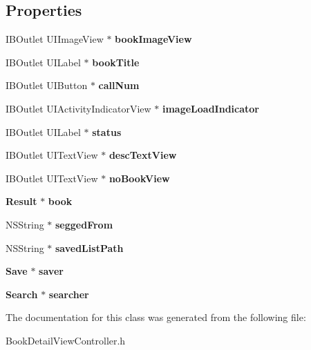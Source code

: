 \subsection*{Properties}
\begin{DoxyCompactItemize}
\item 
I\+B\+Outlet U\+I\+Image\+View $\ast$ {\bfseries book\+Image\+View}\label{interface_book_detail_view_controller_abc652edd9ccc4d9fcfb4509549ebbcca}

\item 
I\+B\+Outlet U\+I\+Label $\ast$ {\bfseries book\+Title}\label{interface_book_detail_view_controller_a8f8b751361cea806a31f828fd3b395a2}

\item 
I\+B\+Outlet U\+I\+Button $\ast$ {\bfseries call\+Num}\label{interface_book_detail_view_controller_aaf51d427a091cbbc8d56a583aae4c67f}

\item 
I\+B\+Outlet U\+I\+Activity\+Indicator\+View $\ast$ {\bfseries image\+Load\+Indicator}\label{interface_book_detail_view_controller_ae94c1e164a8be1c581349ed211421f18}

\item 
I\+B\+Outlet U\+I\+Label $\ast$ {\bfseries status}\label{interface_book_detail_view_controller_a7a734fdbd38ad55ff9dd7a1eac4f7851}

\item 
I\+B\+Outlet U\+I\+Text\+View $\ast$ {\bfseries desc\+Text\+View}\label{interface_book_detail_view_controller_a5041896b84e981aff8352686c6d163af}

\item 
I\+B\+Outlet U\+I\+Text\+View $\ast$ {\bfseries no\+Book\+View}\label{interface_book_detail_view_controller_a97334f844c3562b73bafd253a50ba060}

\item 
{\bf Result} $\ast$ {\bfseries book}\label{interface_book_detail_view_controller_afcef6fbafb9b021381b32df9a13d0b51}

\item 
N\+S\+String $\ast$ {\bfseries segged\+From}\label{interface_book_detail_view_controller_abd428e31e5786f92a707845b65f8307c}

\item 
N\+S\+String $\ast$ {\bfseries saved\+List\+Path}\label{interface_book_detail_view_controller_ab7004065d69e9415b54a4d8fb09669ec}

\item 
{\bf Save} $\ast$ {\bfseries saver}\label{interface_book_detail_view_controller_ac3455e9a6270af9f460694ec241af5ae}

\item 
{\bf Search} $\ast$ {\bfseries searcher}\label{interface_book_detail_view_controller_af7ab497759e614df06f71b732931a6ac}

\end{DoxyCompactItemize}


The documentation for this class was generated from the following file\+:\begin{DoxyCompactItemize}
\item 
Book\+Detail\+View\+Controller.\+h\end{DoxyCompactItemize}
